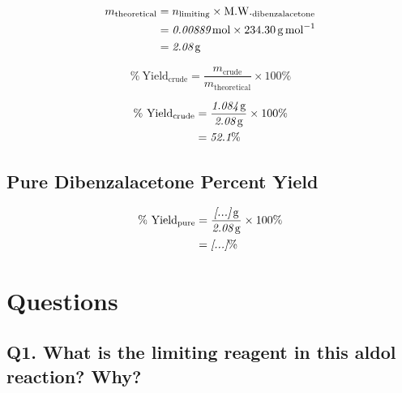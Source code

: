 \documentclass[
  10pt,
  twocolumn,
  letterpaper,
]{article}
\begin{document}
\begin{align*}
  m_{\text{theoretical}} &= n_{\text{limiting}} \times \text{M.W.}_{\text{dibenzalacetone}} \\
                         &= \textit{0.00889\,\si{\mol}} \times \SI{234.30}{\gram\per\mol} \\
                         &= \textit{2.08\,\si{\gram}}
\end{align*}

\begin{equation}
  \%\ \text{Yield}_{\text{crude}}
  = \frac{m_{\text{crude}}}{m_{\text{theoretical}}} \times 100\%
  \label{eq:crude-yield}
\end{equation}

\begin{align*}
  \%\ \text{Yield}_{\text{crude}}
  &= \frac{\textit{1.084\,\si{\gram}}}{\textit{2.08\,\si{\gram}}} \times 100\% \\
  &= \textit{52.1}\%
\end{align*}


\subsection{Pure Dibenzalacetone Percent Yield}


\begin{align*}
  \%\ \text{Yield}_{\text{pure}}
  &= \frac{\textit{[...]\,\si{\gram}}}{\textit{2.08\,\si{\gram}}} \times 100\% \\
  &= \textit{[...]}\%
\end{align*}


\section{Questions}

\subsection{Q1. What is the limiting reagent in this aldol reaction?  Why?}
\end{document}

